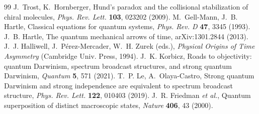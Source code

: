\documentclass[11pt]{article}
\begin{document}
\begin{thebibliography}{99}
 J.~Trost, K.~Hornberger, Hund's paradox and the collisional stabilization of chiral molecules, \emph{Phys. Rev. Lett.} \textbf{103}, 023202 (2009).
 M.~Gell-Mann, J.~B. Hartle, Classical equations for quantum systems, \emph{Phys. Rev. D} \textbf{47}, 3345 (1993).
 J.~B. Hartle, The quantum mechanical arrows of time, arXiv:1301.2844 (2013).
 J.~J. Halliwell, J.~P\'erez-Mercader, W.~H. Zurek (eds.), \emph{Physical Origins of Time Asymmetry} (Cambridge Univ. Press, 1994).
 J.~K. Korbicz, Roads to objectivity: quantum Darwinism, spectrum broadcast structures, and strong quantum Darwinism, \emph{Quantum} \textbf{5}, 571 (2021).
 T.~P. Le, A.~Olaya-Castro, Strong quantum Darwinism and strong independence are equivalent to spectrum broadcast structure, \emph{Phys. Rev. Lett.} \textbf{122}, 010403 (2019).
 J.~R. Friedman \emph{et al.}, Quantum superposition of distinct macroscopic states, \emph{Nature} \textbf{406}, 43 (2000).
\end{thebibliography}
\end{document}
